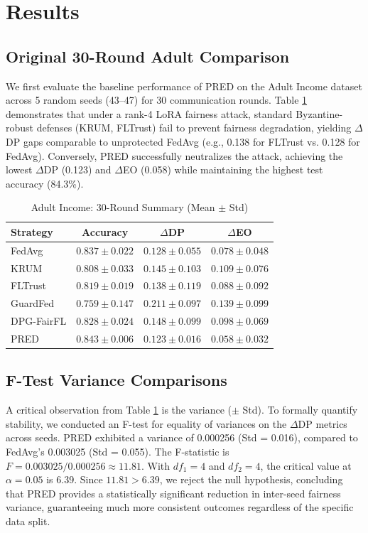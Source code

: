\documentclass[journal]{IEEEtran}
\begin{document}
\section{Results}
\subsection{Original 30-Round Adult Comparison}
We first evaluate the baseline performance of PRED on the Adult Income dataset across 5 random seeds (43--47) for 30 communication rounds. Table \ref{tab:adult30} demonstrates that under a rank-4 LoRA fairness attack, standard Byzantine-robust defenses (KRUM, FLTrust) fail to prevent fairness degradation, yielding $\Delta$DP gaps comparable to unprotected FedAvg (e.g., 0.138 for FLTrust vs. 0.128 for FedAvg). Conversely, PRED successfully neutralizes the attack, achieving the lowest $\Delta$DP (0.123) and $\Delta$EO (0.058) while maintaining the highest test accuracy (84.3\%).

\begin{table}[htbp]
\centering
\caption{Adult Income: 30-Round Summary (Mean $\pm$ Std)}
\label{tab:adult30}
\begin{tabular}{lccc}
\toprule
\textbf{Strategy} & \textbf{Accuracy} & \textbf{$\Delta$DP} & \textbf{$\Delta$EO} \\
\midrule
FedAvg & $0.837 \pm 0.022$ & $0.128 \pm 0.055$ & $0.078 \pm 0.048$ \\
KRUM & $0.808 \pm 0.033$ & $0.145 \pm 0.103$ & $0.109 \pm 0.076$ \\
FLTrust & $0.819 \pm 0.019$ & $0.138 \pm 0.119$ & $0.088 \pm 0.092$ \\
GuardFed & $0.759 \pm 0.147$ & $0.211 \pm 0.097$ & $0.139 \pm 0.099$ \\
DPG-FairFL & $0.828 \pm 0.024$ & $0.148 \pm 0.099$ & $0.098 \pm 0.069$ \\
PRED & $\mathbf{0.843 \pm 0.006}$ & $\mathbf{0.123 \pm 0.016}$ & $\mathbf{0.058 \pm 0.032}$ \\
\bottomrule
\end{tabular}
\end{table}

\subsection{F-Test Variance Comparisons}
A critical observation from Table \ref{tab:adult30} is the variance ($\pm$ Std). To formally quantify stability, we conducted an F-test for equality of variances on the $\Delta$DP metrics across seeds. PRED exhibited a variance of 0.000256 (Std = 0.016), compared to FedAvg's 0.003025 (Std = 0.055). The F-statistic is $F = 0.003025 / 0.000256 \approx 11.81$. With $df_1=4$ and $df_2=4$, the critical value at $\alpha=0.05$ is 6.39. Since $11.81 > 6.39$, we reject the null hypothesis, concluding that PRED provides a statistically significant reduction in inter-seed fairness variance, guaranteeing much more consistent outcomes regardless of the specific data split.
\end{document}
